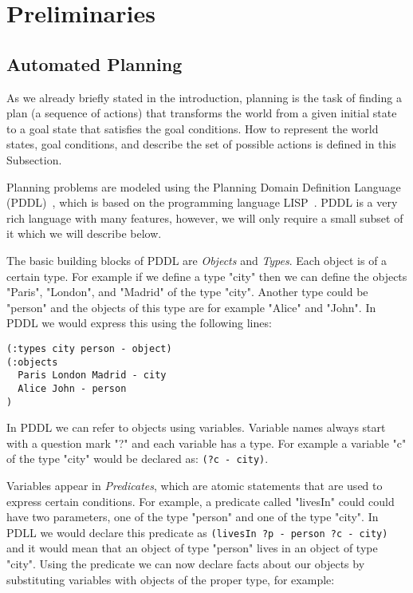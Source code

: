 \documentclass[runningheads]{llncs}
\begin{document}
\section{Preliminaries}

\subsection{Automated Planning}
As we already briefly stated in the introduction, planning is the task of finding a plan (a sequence of
actions) that transforms the world from a given initial state to a goal state that satisfies the
goal conditions. How to represent the world states, goal conditions, and describe the set of possible actions is
defined in this Subsection.

Planning problems are modeled using the Planning Domain Definition Language (PDDL)~\cite{haslumIntroductionPlanningDomain2019a}, which is
based on the programming language LISP~\cite{lisp86}. PDDL is a very rich language with many features, however, we
will only require a small subset of it which we will describe below.

The basic building blocks of PDDL are \emph{Objects} and \emph{Types}. Each object is of a certain
type. For example if we define a type "city" then we can define the objects "Paris", "London", and "Madrid" of
the type "city". Another type could be "person" and the objects of this type are for example "Alice" and "John".
In PDDL we would express this using the following lines:

\begin{verbatim}
(:types city person - object)
(:objects
  Paris London Madrid - city
  Alice John - person
)
\end{verbatim}

In PDDL we can refer to objects using variables. Variable names always start with a question mark "?" and each
variable has a type. For example a variable "c" of the type "city" would be declared as: \verb _(?c - city)_.

Variables appear in \emph{Predicates}, which are atomic statements that are used to express certain
conditions. For example, a predicate called "livesIn" could could have two parameters, one of the type "person"
and one of the type "city". In PDLL we would declare this predicate as \verb _(livesIn ?p - person ?c - city)_
and it would mean that an object of type "person" lives in an object of type "city". Using the predicate
we can now declare facts about our objects by substituting variables with objects of the proper type, for example:
\end{document}
